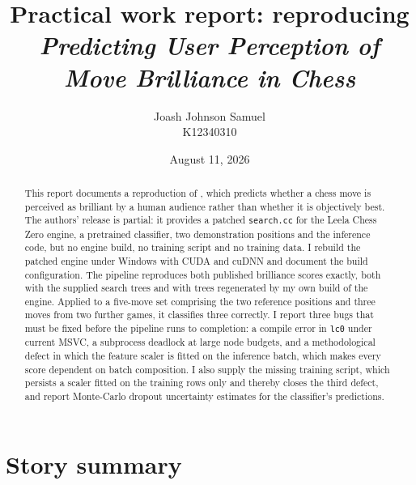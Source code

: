 \documentclass[11pt,a4paper]{article}
\title{Practical work report: reproducing\\\emph{Predicting User Perception of Move
       Brilliance in Chess}}
\author{Joash Johnson Samuel \\ K12340310}
\date{August 11, 2026}
\begin{document}
\maketitle

\begin{abstract}
This report documents a reproduction of \citet{zaidi2024brilliant},
which predicts whether a chess move is perceived as brilliant by a
human audience rather than whether it is objectively best. The
authors' release is partial: it provides a patched \texttt{search.cc}
for the Leela Chess Zero engine, a pretrained classifier, two
demonstration positions and the inference code, but no engine build,
no training script and no training data. I rebuild the patched engine
under Windows with CUDA and cuDNN and document the build
configuration. The pipeline reproduces both published brilliance
scores exactly, both with the supplied search trees and with trees
regenerated by my own build of the engine. Applied to a five-move set
comprising the two reference positions and three moves from two
further games, it classifies three correctly. I report
three bugs that must be fixed before the pipeline runs to completion:
a compile error in \texttt{lc0} under current MSVC, a subprocess
deadlock at large node budgets, and a methodological defect in which
the feature scaler is fitted on the inference batch, which makes every
score dependent on batch composition. I also supply the missing
training script, which persists a scaler fitted on the training rows
only and thereby closes the third defect, and report Monte-Carlo
dropout uncertainty estimates for the classifier's predictions.
\end{abstract}

\section*{Story summary}
\end{document}
